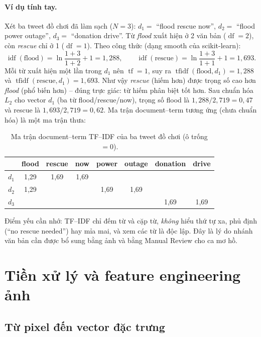 \paragraph{Ví dụ tính tay.} Xét ba tweet đồ chơi đã làm sạch (\(N=3\)):
\(d_1=\) ``flood rescue now'', \(d_2=\) ``flood power outage'',
\(d_3=\) ``donation drive''. Từ \emph{flood} xuất hiện ở 2 văn bản
(\(\operatorname{df}=2\)), còn \emph{rescue} chỉ ở 1 (\(\operatorname{df}=1\)).
Theo công thức (dạng smooth của scikit-learn):
\[
\operatorname{idf}(\text{flood})=\ln\frac{1+3}{1+2}+1=1{,}288,\qquad
\operatorname{idf}(\text{rescue})=\ln\frac{1+3}{1+1}+1=1{,}693.
\]
Mỗi từ xuất hiện một lần trong \(d_1\) nên \(\operatorname{tf}=1\), suy ra
\(\operatorname{tfidf}(\text{flood},d_1)=1{,}288\) và
\(\operatorname{tfidf}(\text{rescue},d_1)=1{,}693\). Như vậy \emph{rescue}
(hiếm hơn) được trọng số cao hơn \emph{flood} (phổ biến hơn) -- đúng trực giác:
từ hiếm phân biệt tốt hơn. Sau chuẩn hóa \(L_2\) cho vector \(d_1\) (ba từ
flood/rescue/now), trọng số flood là \(1{,}288/2{,}719=0{,}47\) và rescue là
\(1{,}693/2{,}719=0{,}62\). Ma trận document--term tương ứng (chưa chuẩn hóa)
là một ma trận thưa:

\begin{table}[H]\centering\small
\caption{Ma trận document--term TF--IDF của ba tweet đồ chơi (ô trống $=0$).}
\begin{tabular}{lccccccc}
\toprule
& \textbf{flood} & \textbf{rescue} & \textbf{now} & \textbf{power}
& \textbf{outage} & \textbf{donation} & \textbf{drive}\\
\midrule
\(d_1\) & 1,29 & 1,69 & 1,69 & & & &\\
\(d_2\) & 1,29 & & & 1,69 & 1,69 & &\\
\(d_3\) & & & & & & 1,69 & 1,69\\
\bottomrule
\end{tabular}
\end{table}

Điểm yếu cần nhớ: TF--IDF chỉ đếm từ và cặp từ, \emph{không} hiểu thứ tự xa,
phủ định (``no rescue needed'') hay mỉa mai, và xem các từ là độc lập. Đây là lý
do nhánh văn bản cần được bổ sung bằng ảnh và bằng Manual Review cho ca mơ hồ.

\section{Tiền xử lý và feature engineering ảnh}

\subsection{Từ pixel đến vector đặc trưng}

